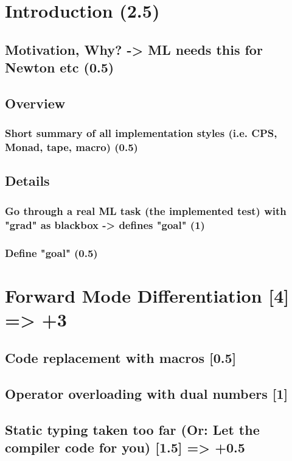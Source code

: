 % 
\chapter{Introduction (2.5)}
	\section{Motivation, Why? -> ML needs this for Newton etc (0.5)}
	\section{Overview}
		\subsection{Short summary of all implementation styles (i.e. CPS, Monad, tape, macro) (0.5)}
	\section{Details}
		\subsection{Go through a real ML task (the implemented test) with "grad" as blackbox -> defines "goal" (1)}
		\subsection{Define "goal" (0.5)}
% 

\chapter{Forward Mode Differentiation [4] => +3}
	\section{Code replacement with macros [0.5]}
	\section{Operator overloading with dual numbers [1]}
	\section{Static typing taken too far (Or: Let the compiler code for you) [1.5] => +0.5}

